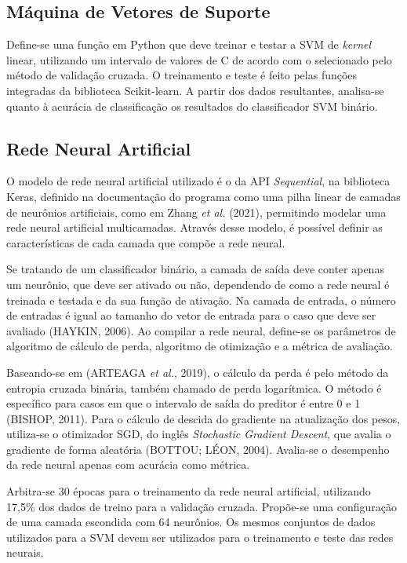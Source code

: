 \documentclass[12pt,oneside,a4paper,chapter=TITLE,section=TITLE,sumario=tradicional,english,brazil]{abntex2}
\begin{document}
\subsection{Máquina de Vetores de Suporte}
Define-se uma função em Python que deve treinar e testar a SVM de \textit{kernel} linear, utilizando um intervalo de valores de C de acordo com o selecionado pelo método de validação cruzada. O treinamento e teste é feito pelas funções integradas da biblioteca Scikit-learn. A partir dos dados resultantes, analisa-se quanto à acurácia de classificação os resultados do classificador SVM binário. \par 
  
\subsection{Rede Neural Artificial}
O modelo de rede neural artificial utilizado é o da API \textit{Sequential}, na biblioteca Keras, definido na documentação do programa como uma pilha linear de camadas de neurônios artificiais, como em Zhang \textit{et al.} (2021), permitindo modelar uma rede neural artificial multicamadas. Através desse modelo, é possível definir as características de cada camada que compõe a rede neural.\par 
Se tratando de um classificador binário, a camada de saída deve conter apenas um neurônio, que deve ser ativado ou não, dependendo de como a rede neural é treinada e testada e da sua função de ativação. Na camada de entrada, o número de entradas é igual ao tamanho do vetor de entrada para o caso que deve ser avaliado (HAYKIN, 2006). Ao compilar a rede neural, define-se os parâmetros de algoritmo de cálculo de perda, algoritmo de otimização e a métrica de avaliação. \par 
Baseando-se em (ARTEAGA \textit{et al.}, 2019), o cálculo da perda é pelo método da entropia cruzada binária, também chamado de perda logarítmica. O método é específico para casos em que o intervalo de saída do preditor é entre 0 e 1 (BISHOP, 2011). Para o cálculo de descida do gradiente na atualização dos pesos, utiliza-se o otimizador SGD, do inglês \textit{Stochastic Gradient Descent}, que avalia o gradiente de forma aleatória (BOTTOU; LÉON, 2004). Avalia-se o desempenho da rede neural apenas com acurácia como métrica.\par 
Arbitra-se 30 épocas para o treinamento da rede neural artificial, utilizando 17,5\% dos dados de treino para a validação cruzada. Propõe-se uma configuração de uma camada escondida com 64 neurônios. Os mesmos conjuntos de dados utilizados para a SVM devem ser utilizados para o treinamento e teste das redes neurais.\par 
{}
\end{document}
